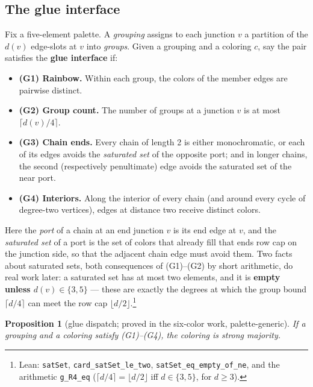 \documentclass[11pt]{article}
\newtheorem{proposition}[theorem]{Proposition}
\theoremstyle{definition}
\theoremstyle{remark}
\providecommand{\tightlist}{\setlength{\itemsep}{0pt}\setlength{\parskip}{0pt}}
\begin{document}
\subsection{The glue interface}\label{22-the-glue-interface}

Fix a five-element palette. A \emph{grouping} assigns to each junction \(v\) a partition of the \(d(v)\) edge-slots at \(v\) into \emph{groups}. Given a grouping and a coloring \(c\), say the pair satisfies the \textbf{glue interface} if:

\begin{itemize}
\tightlist
\item
  \textbf{(G1) Rainbow.} Within each group, the colors of the member edges are pairwise distinct.
\item
  \textbf{(G2) Group count.} The number of groups at a junction \(v\) is at most \(\lceil d(v)/4 \rceil\).
\item
  \textbf{(G3) Chain ends.} Every chain of length 2 is either monochromatic, or each of its edges avoids the \emph{saturated set} of the opposite port; and in longer chains, the second (respectively penultimate) edge avoids the saturated set of the near port.
\item
  \textbf{(G4) Interiors.} Along the interior of every chain (and around every cycle of degree-two vertices), edges at distance two receive distinct colors.
\end{itemize}

Here the \emph{port} of a chain at an end junction \(v\) is its end edge at \(v\), and the \emph{saturated set} of a port is the set of colors that already fill that end\textquotesingle s row cap on the junction side, so that the adjacent chain edge must avoid them. Two facts about saturated sets, both consequences of (G1)--(G2) by short arithmetic, do real work later: a saturated set has at most two elements, and it is \textbf{empty unless \(d(v) \in \{3, 5\}\)} --- these are exactly the degrees at which the group bound \(\lceil d/4 \rceil\) can meet the row cap \(\lfloor d/2 \rfloor\).\footnote{Lean: \texttt{satSet}, \texttt{card\_satSet\_le\_two}, \texttt{satSet\_eq\_empty\_of\_ne}, and the arithmetic \texttt{g\_R4\_eq} (\(\lceil d/4\rceil = \lfloor d/2\rfloor\) iff \(d \in \{3,5\}\), for \(d \ge 3\)).}

\begin{proposition}[glue dispatch; proved in the six-color work, palette-generic]
If a grouping and a coloring satisfy (G1)--(G4), the coloring is strong majority.
\end{proposition}
\end{document}

